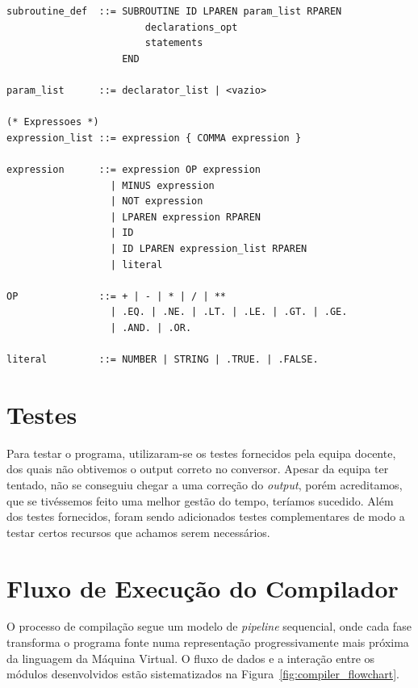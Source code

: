 \documentclass[12pt, a4paper]{article}
\begin{document}
\begin{lstlisting}[caption=Gramática BNF do Compilador]
subroutine_def  ::= SUBROUTINE ID LPAREN param_list RPAREN
                        declarations_opt
                        statements
                    END

param_list      ::= declarator_list | <vazio>

(* Expressoes *)
expression_list ::= expression { COMMA expression }

expression      ::= expression OP expression
                  | MINUS expression
                  | NOT expression
                  | LPAREN expression RPAREN
                  | ID
                  | ID LPAREN expression_list RPAREN
                  | literal

OP              ::= + | - | * | / | **
                  | .EQ. | .NE. | .LT. | .LE. | .GT. | .GE.
                  | .AND. | .OR.

literal         ::= NUMBER | STRING | .TRUE. | .FALSE.
\end{lstlisting}
\section{Testes}
Para testar o programa, utilizaram-se os testes fornecidos pela equipa docente, dos quais não obtivemos o output correto no conversor. Apesar da equipa ter tentado, não se conseguiu chegar a uma correção do \textit{output}, porém acreditamos, que se tivéssemos feito uma melhor gestão do tempo, teríamos sucedido. 
Além dos testes fornecidos, foram sendo adicionados testes complementares de modo a testar certos recursos que achamos serem necessários.

\section{Fluxo de Execução do Compilador}
O processo de compilação segue um modelo de \textit{pipeline} sequencial, onde cada fase transforma o programa fonte numa representação progressivamente mais próxima da linguagem da Máquina Virtual. O fluxo de dados e a interação entre os módulos desenvolvidos estão sistematizados na Figura~\ref{fig:compiler_flowchart}.
\end{document}
